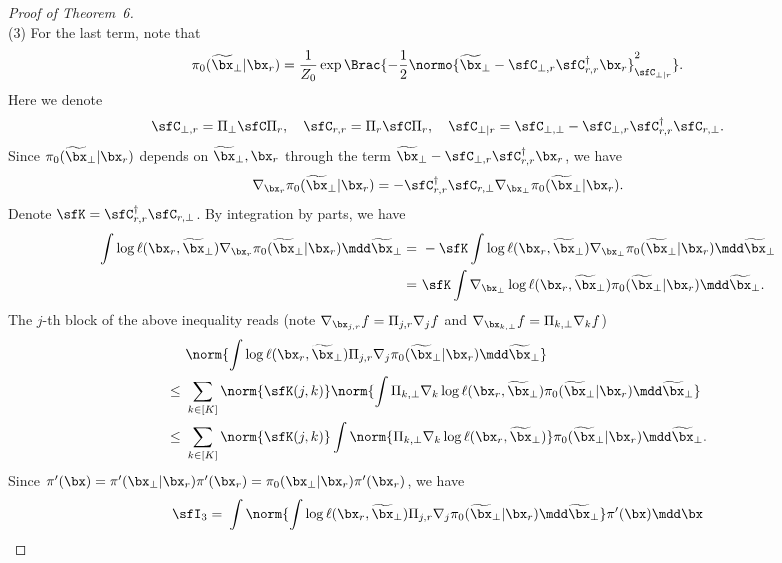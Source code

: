 \documentclass[11pt]{article}
\begin{document}
\begin{proof}[Proof of Theorem~6]
\ \\[-5pt]
\noindent
(3) For the last term, note that
\[
    \pi_0(\widetilde{\bx}_\bot|\bx_r) = \frac{1}{Z_0} \exp \Brac{ - \frac{1}{2} \normo{ \widetilde{\bx}_\bot - \sfC_{\bot,r} \sfC_{r,r}^\dag \bx_r }^2_{\sfC_{\bot|r}}  }.
\]
Here we denote 
\[
    \sfC_{\bot,r} = \Pi_{\bot} \sfC \Pi_{r}, \quad \sfC_{r,r} = \Pi_{r} \sfC \Pi_{r}, \quad \sfC_{\bot|r} = \sfC_{\bot,\bot} - \sfC_{\bot,r} \sfC_{r,r}^\dag \sfC_{r,\bot}.
\]
Since $\pi_0(\widetilde{\bx}_\bot|\bx_r)$ depends on $\widetilde{\bx}_\bot,\bx_r$ through the term $\widetilde{\bx}_\bot - \sfC_{\bot,r} \sfC_{r,r}^\dag \bx_r$, we have
\[
    \nabla_{\bx_r} \pi_0(\widetilde{\bx}_\bot|\bx_r) = - \sfC_{r,r}^\dag \sfC_{r,\bot} \nabla_{\bx_\bot} \pi_0(\widetilde{\bx}_\bot|\bx_r). 
\]
Denote $\sfK = \sfC_{r,r}^\dag \sfC_{r,\bot}$. By integration by parts, we have 
\begin{align*}
    \int \log \ell(\bx_r,\widetilde{\bx}_\bot) \nabla_{\bx_r} \pi_0(\widetilde{\bx}_\bot|\bx_r) \mdd \widetilde{\bx}_\bot =~& - \sfK \int \log \ell(\bx_r,\widetilde{\bx}_\bot) \nabla_{\bx_\bot} \pi_0(\widetilde{\bx}_\bot|\bx_r) \mdd \widetilde{\bx}_\bot \\
    =~& \sfK \int \nabla_{\bx_\bot} \log \ell(\bx_r,\widetilde{\bx}_\bot) \pi_0(\widetilde{\bx}_\bot|\bx_r) \mdd \widetilde{\bx}_\bot.
\end{align*}
%
The $j$-th block of the above inequality reads (note $\nabla_{\bx_{j,r}} f = \Pi_{j,r} \nabla_j f$ and $\nabla_{\bx_{k,\bot}} f = \Pi_{k,\bot} \nabla_k f$)
\begin{align*}
    & \norm{ \int \log \ell(\bx_r,\widetilde{\bx}_\bot) \Pi_{j,r} \nabla_j \pi_0(\widetilde{\bx}_\bot|\bx_r) \mdd \widetilde{\bx}_\bot } \\
    \le~& \sum_{k\in[K]} \norm{\sfK(j,k)} \norm{ \int \Pi_{k,\bot} \nabla_k \log \ell(\bx_r,\widetilde{\bx}_\bot) \pi_0(\widetilde{\bx}_\bot|\bx_r) \mdd \widetilde{\bx}_\bot } \\
    \le~& \sum_{k\in[K]} \norm{\sfK(j,k)} \int \norm{ \Pi_{k,\bot} \nabla_k \log \ell(\bx_r,\widetilde{\bx}_\bot) }\pi_0(\widetilde{\bx}_\bot|\bx_r) \mdd \widetilde{\bx}_\bot. 
\end{align*}
Since $\pi'(\bx) = \pi'(\bx_\bot|\bx_r) \pi'(\bx_r) = \pi_0(\bx_\bot|\bx_r) \pi'(\bx_r)$, we have
\begin{align*}
    \sfI_3 =~& \int \norm{ \int \log \ell(\bx_r,\widetilde{\bx}_\bot) \Pi_{j,r} \nabla_j \pi_0(\widetilde{\bx}_\bot|\bx_r) \mdd \widetilde{\bx}_\bot } \pi'(\bx) \mdd \bx \\

\end{align*}
\end{proof}
\end{document}
